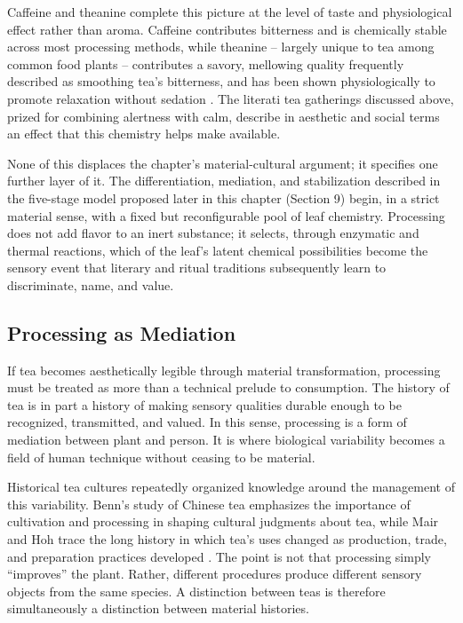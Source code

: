 \documentclass[numbers]{IntechOpen-Book}
\begin{document}
Caffeine and theanine complete this picture at the level of taste and physiological effect rather than aroma. Caffeine contributes bitterness and is chemically stable across most processing methods, while theanine -- largely unique to tea among common food plants -- contributes a savory, mellowing quality frequently described as smoothing tea's bitterness, and has been shown physiologically to promote relaxation without sedation \cite{juneja1999}. The literati tea gatherings discussed above, prized for combining alertness with calm, describe in aesthetic and social terms an effect that this chemistry helps make available.

None of this displaces the chapter's material-cultural argument; it specifies one further layer of it. The differentiation, mediation, and stabilization described in the five-stage model proposed later in this chapter (Section 9) begin, in a strict material sense, with a fixed but reconfigurable pool of leaf chemistry. Processing does not add flavor to an inert substance; it selects, through enzymatic and thermal reactions, which of the leaf's latent chemical possibilities become the sensory event that literary and ritual traditions subsequently learn to discriminate, name, and value.

\subsection{Processing as Mediation}

If tea becomes aesthetically legible through material transformation, processing must be treated as more than a technical prelude to consumption. The history of tea is in part a history of making sensory qualities durable enough to be recognized, transmitted, and valued. In this sense, processing is a form of mediation between plant and person. It is where biological variability becomes a field of human technique without ceasing to be material.

Historical tea cultures repeatedly organized knowledge around the management of this variability. Benn's study of Chinese tea emphasizes the importance of cultivation and processing in shaping cultural judgments about tea, while Mair and Hoh trace the long history in which tea's uses changed as production, trade, and preparation practices developed \cite{benn,mair}. The point is not that processing simply ``improves'' the plant. Rather, different procedures produce different sensory objects from the same species. A distinction between teas is therefore simultaneously a distinction between material histories.
\end{document}
